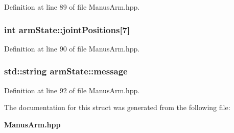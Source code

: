 \-Definition at line 89 of file \-Manus\-Arm.\-hpp.

\subsubsection[{joint\-Positions}]{\setlength{\rightskip}{0pt plus 5cm}int {\bf arm\-State\-::joint\-Positions}[7]}\label{structarmState_a7e9e18c429323ecabf773a070c6d4eba}


\-Definition at line 90 of file \-Manus\-Arm.\-hpp.

\subsubsection[{message}]{\setlength{\rightskip}{0pt plus 5cm}std\-::string {\bf arm\-State\-::message}}\label{structarmState_a217a56d5c4b7101f25667601ce1b1dd7}


\-Definition at line 92 of file \-Manus\-Arm.\-hpp.



\-The documentation for this struct was generated from the following file\-:\begin{DoxyCompactItemize}
\item 
{\bf \-Manus\-Arm.\-hpp}\end{DoxyCompactItemize}
